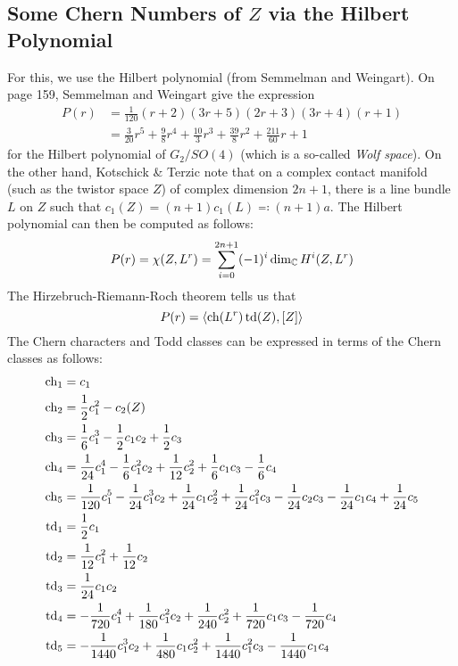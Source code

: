 \documentclass{scrartcl}
\begin{document}
\subsection{Some Chern Numbers of $Z$ via the Hilbert Polynomial}

For this, we use the Hilbert polynomial (from Semmelman and Weingart). On page 159, Semmelman and Weingart give the expression 
\begin{align*}
	P(r)&=\frac{1}{120}(r+2)(3r+5)(2r+3)(3r+4)(r+1)\\
	&=\frac{3}{20}r^5+\frac{9}{8}r^4+\frac{10}{3}r^3+\frac{39}{8}r^2+\frac{211}{60}r+1
\end{align*}
for the Hilbert polynomial of $G_2/SO(4)$ (which is a so-called \emph{Wolf space}). On the other hand, Kotschick \& Terzic note that on a complex contact manifold (such as the twistor space $Z$) of complex dimension $2n+1$, there is a line bundle $L$ on $Z$ such that $c_1(Z)=(n+1)c_1(L)\eqqcolon (n+1)a$. The Hilbert polynomial can then be computed as follows:
\begin{equation*}
	P(r)=\chi(Z,L^r)=\sum_{i=0}^{2n+1}(-1)^i \dim_{\mathbb{C}} H^i(Z,L^r)
\end{equation*}
The Hirzebruch-Riemann-Roch theorem tells us that
\begin{equation*}
	P(r)=\langle \operatorname{ch} (L^r)\operatorname{td}(Z),[Z]\rangle
\end{equation*}
The Chern characters and Todd classes can be expressed in terms of the Chern classes as follows:
\begin{align*}
	\operatorname{ch}_1&=c_1 \\
	\operatorname{ch}_2&=\frac{1}{2}c_1^2-c_2(Z)\\
	\operatorname{ch}_3&=\frac{1}{6}c_1^3-\frac{1}{2}c_1c_2+\frac{1}{2}c_3\\
	\operatorname{ch}_4&=\frac{1}{24}c_1^4-\frac{1}{6}c_1^2c_2
	+\frac{1}{12}c_2^2+\frac{1}{6}c_1c_3-\frac{1}{6}c_4\\
	\operatorname{ch}_5&=\frac{1}{120}c_1^5-\frac{1}{24}c_1^3c_2+\frac{1}{24}c_1c_2^2
	+\frac{1}{24}c_1^2c_3-\frac{1}{24}c_2c_3-\frac{1}{24}c_1c_4+\frac{1}{24}c_5\\
	\operatorname{td}_1&=\frac{1}{2}c_1\\
	\operatorname{td}_2&=\frac{1}{12}c_1^2+\frac{1}{12}c_2\\
	\operatorname{td}_3&=\frac{1}{24}c_1c_2\\
	\operatorname{td}_4&=-\frac{1}{720}c_1^4+\frac{1}{180}c_1^2c_2+\frac{1}{240}c_2^2
	+\frac{1}{720}c_1c_3-\frac{1}{720}c_4\\
	\operatorname{td}_5&=-\frac{1}{1440}c_1^3c_2+\frac{1}{480}c_1c_2^2+\frac{1}{1440}c_1^2c_3
	-\frac{1}{1440}c_1c_4
\end{align*}
\end{document}

